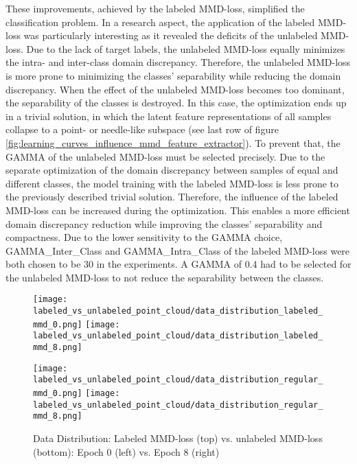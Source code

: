 These improvements, achieved by the labeled MMD-loss, simplified the classification problem. In a  research aspect, the application of the labeled MMD-loss was particularly interesting as it revealed the deficits of the unlabeled MMD-loss. Due to the lack of target labels, the unlabeled MMD-loss equally minimizes the intra- and inter-class domain discrepancy. Therefore, the unlabeled MMD-loss is more prone to minimizing the classes' separability while reducing the domain discrepancy. When the effect of the unlabeled MMD-loss becomes too dominant, the separability of the classes is destroyed. In this case, the optimization ends up in a trivial solution, in which the latent feature representations of all samples collapse to a point- or needle-like subspace (see last row of figure \ref{fig:learning_curves_influence_mmd_feature_extractor}). To prevent that, the GAMMA of the unlabeled MMD-loss must be selected precisely. Due to the separate optimization of the domain discrepancy between samples of equal and different classes, the model training with the labeled MMD-loss is less prone to the previously described trivial solution. Therefore, the influence of the labeled MMD-loss can be increased during the optimization. This enables a more efficient domain discrepancy reduction while improving the classes' separability and compactness. Due to the lower sensitivity to the GAMMA choice, GAMMA\_Inter\_Class and GAMMA\_Intra\_Class of the labeled MMD-loss were both chosen to be 30 in the experiments. A GAMMA of 0.4 had to be selected for the unlabeled MMD-loss to not reduce the separability between the classes.


\begin{figure}[htp]
  \centering
  \texttt{[image: labeled\_vs\_unlabeled\_point\_cloud/data\_distribution\_labeled\_mmd\_0.png]}
  \hspace{.4cm}
  \texttt{[image: labeled\_vs\_unlabeled\_point\_cloud/data\_distribution\_labeled\_mmd\_8.png]}

  \vspace{.1cm}

  \texttt{[image: labeled\_vs\_unlabeled\_point\_cloud/data\_distribution\_regular\_mmd\_0.png]}
  \hspace{.4cm}
  \texttt{[image: labeled\_vs\_unlabeled\_point\_cloud/data\_distribution\_regular\_mmd\_8.png]}
  
  \caption{Data Distribution: Labeled MMD-loss (top) vs. unlabeled MMD-loss (bottom): Epoch 0 (left) vs. Epoch 8 (right)}
  \label{fig:point_cloud_labeled_unlabeled_mmd}
\end{figure}


